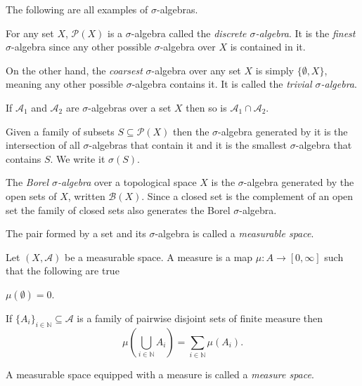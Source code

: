 \documentclass[12pt,oneside]{book}
\numberwithin{table}{section}
\numberwithin{equation}{section}
\numberwithin{figure}{section}
\newcommand{\N}{\mathbb{N}}
\newcommand{\A}{\mathcal{A}}
\newcommand{\B}{\mathcal{B}}
\renewcommand{\P}{\mathcal{P}}
\begin{document}
\begin{exe}
	The following are all examples of \( \sigma \)-algebras.
	\begin{points}
	\item For any set \( X \), \( \P(X) \) is a \( \sigma \)-algebra called the \emph{discrete \( \sigma \)-algebra}. It is the \emph{finest} \( \sigma \)-algebra since any other possible \( \sigma \)-algebra over \( X \) is contained in it.
	\item On the other hand, the \emph{coarsest} \( \sigma \)-algebra over any set \( X \) is simply \( \{ \emptyset, X \} \), meaning any other possible \( \sigma \)-algebra contains it. It is called the \emph{trivial \( \sigma \)-algebra}.
	\item If \( \A_1 \) and \( \A_2 \) are \( \sigma \)-algebras over a set \( X \) then so is \( \A_1 \cap \A_2 \).
	\item Given a family of subsets \( S \subseteq \P(X) \) then the \( \sigma \)-algebra generated by it is the intersection of all \( \sigma \)-algebras that contain it and it is the smallest \( \sigma \)-algebra that contains \( S \). We write it \( \sigma(S) \).
	\item The \emph{Borel \( \sigma \)-algebra} over a topological space \( X \) is the \( \sigma \)-algebra generated by the open sets of \( X \), written \( \B(X) \). Since a closed set is the complement of an open set the family of closed sets also generates the Borel \( \sigma \)-algebra.
	\end{points}
\end{exe}
The pair formed by a set and its \( \sigma \)-algebra is called a \emph{measurable space}.

\begin{defn}[Measure]
	Let \( (X,\A) \) be a measurable space. A measure is a map \( \mu \colon A \to [0,\infty] \) such that the following are true
	\begin{points}
	\item \( \mu(\emptyset) = 0 \).
	\item If \( \{ A_i \}_{i \in \N} \subseteq \A \) is a family of pairwise disjoint sets of finite measure then
		\begin{equation*}
			\mu\left(\bigcup_{i \in \N} A_i\right) = \sum_{i \in \N} \mu(A_i). 
		\end{equation*}
	\end{points}
\end{defn}
A measurable space equipped with a measure is called a \emph{measure space}.
\end{document}
